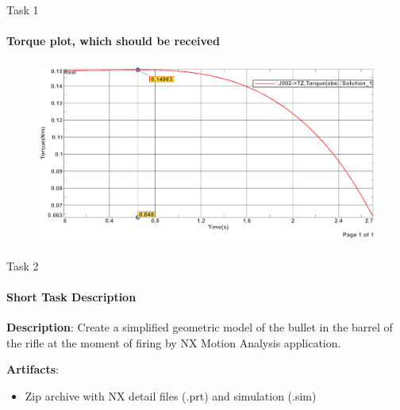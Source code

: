 \documentclass[aspectratio=169]{beamer}
\begin{document}
\begin{frame}[t]{Task 1}
    \framesubtitle{Torque plot, which should be received}
    \vspace{-0.6cm}
    \begin{figure}[H]
        \centering\includegraphics[height=6cm,width=1\textwidth,keepaspectratio]{resources/1_sol.png}
        \label{fig:resources/1_sol.png}
    \end{figure}
\end{frame}

\begin{frame}[t]{Task 2}
    \framesubtitle{Short Task Description}
    \textbf{Description}: Create a simplified geometric model of the bullet in the barrel of the rifle at the moment of firing by NX Motion Analysis application.

    \textbf{Artifacts}:
    \begin{itemize}
        \item Zip archive with NX detail files (.prt) and simulation (.sim)
    \end{itemize}
\end{frame}
\end{document}
